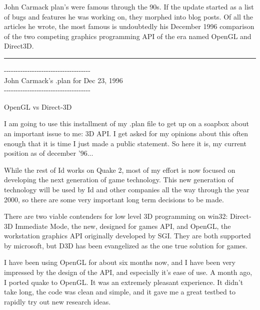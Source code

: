 John Carmack plan's were famous through the 90s. If the update started as a list of bugs and features he was working
on, they morphed into blog posts. Of all the articles he wrote, the most famous is undoubtedly his December 1996 comparison of the two competing graphics programming API of the era named OpenGL and Direct3D.\\
\par
\label{openglvsdirectd}
\hrule \par \bigskip
\begin{allintypewriter}
{-}{-}{-}{-}{-}{-}{-}{-}{-}{-}{-}{-}{-}{-}{-}{-}{-}{-}{-}{-}{-}{-}{-}{-}{-}{-}{-}{-}{-}{-}{-}{-}{-}{-}{-}{-}{-}\\
John Carmack's .plan for Dec 23, 1996\\
{-}{-}{-}{-}{-}{-}{-}{-}{-}{-}{-}{-}{-}{-}{-}{-}{-}{-}{-}{-}{-}{-}{-}{-}{-}{-}{-}{-}{-}{-}{-}{-}{-}{-}{-}{-}{-}\\
\par
OpenGL vs Direct-3D\\
\par
I am going to use this installment of my .plan file to get up on a soapbox
about an important issue to me: 3D API. I get asked for my opinions about
this often enough that it is time I just made a public statement. So here
it is, my current position as of december '96...\\ 
\par
While the rest of Id works on Quake 2, most of my effort is now focused on
developing the next generation of game technology. This new generation of
technology will be used by Id and other companies all the way through the
year 2000, so there are some very important long term decisions to be made.\\ 
\par
There are two viable contenders for low level 3D programming on win32: 
Direct-3D Immediate Mode, the new, designed for games API, and OpenGL, the
workstation graphics API originally developed by SGI. They are both 
supported by microsoft, but D3D has been evangelized as the one true solution
for games.\\ 
\par
I have been using OpenGL for about six months now, and I have been very 
impressed by the design of the API, and especially it's ease of use. A month
ago, I ported quake to OpenGL. It was an extremely pleasant experience. It 
didn't take long, the code was clean and simple, and it gave me a great testbed
to rapidly try out new research ideas.\\ 

\end{allintypewriter}
